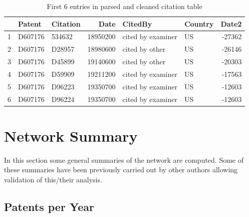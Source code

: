 \begin{table}[ht]
\caption{First 6 entries in parsed and cleaned citation table}
\label{tab:citations}
\centering
\begin{tabular}{rllrllr}
  \hline
 & Patent & Citation & Date & CitedBy & Country & Date2 \\ 
  \hline
1 & D607176 & 534632 & 18950200 & cited by examiner & US & -27362 \\ 
  2 & D607176 & D28957 & 18980600 & cited by other & US & -26146 \\ 
  3 & D607176 & D45899 & 19140600 & cited by other & US & -20303 \\ 
  4 & D607176 & D59909 & 19211200 & cited by examiner & US & -17563 \\ 
  5 & D607176 & D96223 & 19350700 & cited by examiner & US & -12603 \\ 
  6 & D607176 & D96224 & 19350700 & cited by examiner & US & -12603 \\ 
   \hline
\end{tabular}
\end{table} 
\section{Network Summary} \label{Network Summary}

In this section some general summaries of the network are computed. Some of these summaries have been previously carried out by other authors allowing validation of this/their analysis. 


\subsection{Patents per Year} \label{Patents per Year}

